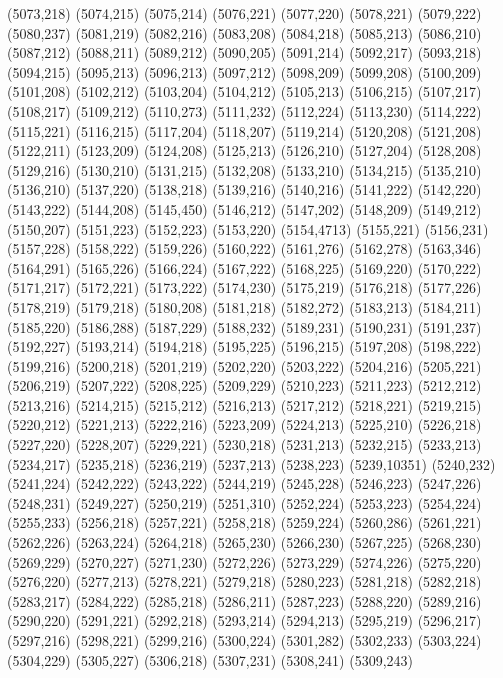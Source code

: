 (5073,218)
(5074,215)
(5075,214)
(5076,221)
(5077,220)
(5078,221)
(5079,222)
(5080,237)
(5081,219)
(5082,216)
(5083,208)
(5084,218)
(5085,213)
(5086,210)
(5087,212)
(5088,211)
(5089,212)
(5090,205)
(5091,214)
(5092,217)
(5093,218)
(5094,215)
(5095,213)
(5096,213)
(5097,212)
(5098,209)
(5099,208)
(5100,209)
(5101,208)
(5102,212)
(5103,204)
(5104,212)
(5105,213)
(5106,215)
(5107,217)
(5108,217)
(5109,212)
(5110,273)
(5111,232)
(5112,224)
(5113,230)
(5114,222)
(5115,221)
(5116,215)
(5117,204)
(5118,207)
(5119,214)
(5120,208)
(5121,208)
(5122,211)
(5123,209)
(5124,208)
(5125,213)
(5126,210)
(5127,204)
(5128,208)
(5129,216)
(5130,210)
(5131,215)
(5132,208)
(5133,210)
(5134,215)
(5135,210)
(5136,210)
(5137,220)
(5138,218)
(5139,216)
(5140,216)
(5141,222)
(5142,220)
(5143,222)
(5144,208)
(5145,450)
(5146,212)
(5147,202)
(5148,209)
(5149,212)
(5150,207)
(5151,223)
(5152,223)
(5153,220)
(5154,4713)
(5155,221)
(5156,231)
(5157,228)
(5158,222)
(5159,226)
(5160,222)
(5161,276)
(5162,278)
(5163,346)
(5164,291)
(5165,226)
(5166,224)
(5167,222)
(5168,225)
(5169,220)
(5170,222)
(5171,217)
(5172,221)
(5173,222)
(5174,230)
(5175,219)
(5176,218)
(5177,226)
(5178,219)
(5179,218)
(5180,208)
(5181,218)
(5182,272)
(5183,213)
(5184,211)
(5185,220)
(5186,288)
(5187,229)
(5188,232)
(5189,231)
(5190,231)
(5191,237)
(5192,227)
(5193,214)
(5194,218)
(5195,225)
(5196,215)
(5197,208)
(5198,222)
(5199,216)
(5200,218)
(5201,219)
(5202,220)
(5203,222)
(5204,216)
(5205,221)
(5206,219)
(5207,222)
(5208,225)
(5209,229)
(5210,223)
(5211,223)
(5212,212)
(5213,216)
(5214,215)
(5215,212)
(5216,213)
(5217,212)
(5218,221)
(5219,215)
(5220,212)
(5221,213)
(5222,216)
(5223,209)
(5224,213)
(5225,210)
(5226,218)
(5227,220)
(5228,207)
(5229,221)
(5230,218)
(5231,213)
(5232,215)
(5233,213)
(5234,217)
(5235,218)
(5236,219)
(5237,213)
(5238,223)
(5239,10351)
(5240,232)
(5241,224)
(5242,222)
(5243,222)
(5244,219)
(5245,228)
(5246,223)
(5247,226)
(5248,231)
(5249,227)
(5250,219)
(5251,310)
(5252,224)
(5253,223)
(5254,224)
(5255,233)
(5256,218)
(5257,221)
(5258,218)
(5259,224)
(5260,286)
(5261,221)
(5262,226)
(5263,224)
(5264,218)
(5265,230)
(5266,230)
(5267,225)
(5268,230)
(5269,229)
(5270,227)
(5271,230)
(5272,226)
(5273,229)
(5274,226)
(5275,220)
(5276,220)
(5277,213)
(5278,221)
(5279,218)
(5280,223)
(5281,218)
(5282,218)
(5283,217)
(5284,222)
(5285,218)
(5286,211)
(5287,223)
(5288,220)
(5289,216)
(5290,220)
(5291,221)
(5292,218)
(5293,214)
(5294,213)
(5295,219)
(5296,217)
(5297,216)
(5298,221)
(5299,216)
(5300,224)
(5301,282)
(5302,233)
(5303,224)
(5304,229)
(5305,227)
(5306,218)
(5307,231)
(5308,241)
(5309,243)
